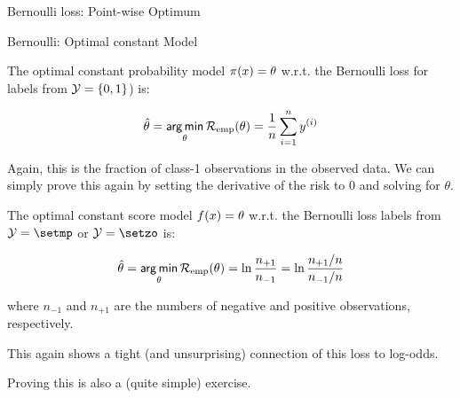 \begin{vbframe}{Bernoulli loss: Point-wise Optimum}




\end{vbframe}



\begin{vbframe}{Bernoulli: Optimal constant Model}

The optimal constant probability model $\pi(x) = \theta$ w.r.t. the Bernoulli loss for labels from $\mathcal{Y} = \{0, 1\}$) is:

\begin{eqnarray*}
  \hat{\theta} = \mathop{\sf arg\,min}_{\theta} \mathcal{R}_{\text{emp}}(\theta) = \frac{1}{n} \sum_{i=1}^n y^{(i)}
\end{eqnarray*}

Again, this is the fraction of class-1 observations in the observed data.
We can simply prove this again by setting the derivative of the risk to 0 and solving for $\theta$.

\framebreak

The optimal constant score model $f(x) = \theta$ w.r.t. the Bernoulli loss labels from $\Yspace = \setmp$ or $\Yspace = \setzo$ is:

\begin{eqnarray*}
  \hat{\theta} = \mathop{\sf arg\,min}_{\theta} \mathcal{R}_{\text{emp}}(\theta) = \ln \frac{n_{+1}}{n_{-1}} = \ln \frac{n_{+1}/n}{n_{-1}/n} 
\end{eqnarray*}

where $n_{-1}$ and $n_{+1}$ are the numbers of negative and positive observations, respectively.

\lz

This again shows a tight (and unsurprising) connection of this loss to log-odds.

\lz

Proving this is also a (quite simple) exercise.

\end{vbframe}

